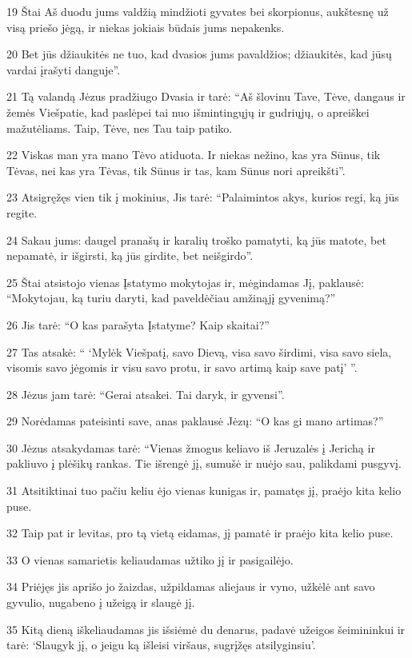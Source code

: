 \par 19 Štai Aš duodu jums valdžią mindžioti gyvates bei skorpionus, aukštesnę už visą priešo jėgą, ir niekas jokiais būdais jums nepakenks. 
\par 20 Bet jūs džiaukitės ne tuo, kad dvasios jums pavaldžios; džiaukitės, kad jūsų vardai įrašyti danguje”. 
\par 21 Tą valandą Jėzus pradžiugo Dvasia ir tarė: “Aš šlovinu Tave, Tėve, dangaus ir žemės Viešpatie, kad paslėpei tai nuo išmintingųjų ir gudriųjų, o apreiškei mažutėliams. Taip, Tėve, nes Tau taip patiko. 
\par 22 Viskas man yra mano Tėvo atiduota. Ir niekas nežino, kas yra Sūnus, tik Tėvas, nei kas yra Tėvas, tik Sūnus ir tas, kam Sūnus nori apreikšti”. 
\par 23 Atsigręžęs vien tik į mokinius, Jis tarė: “Palaimintos akys, kurios regi, ką jūs regite. 
\par 24 Sakau jums: daugel pranašų ir karalių troško pamatyti, ką jūs matote, bet nepamatė, ir išgirsti, ką jūs girdite, bet neišgirdo”. 
\par 25 Štai atsistojo vienas Įstatymo mokytojas ir, mėgindamas Jį, paklausė: “Mokytojau, ką turiu daryti, kad paveldėčiau amžinąjį gyvenimą?” 
\par 26 Jis tarė: “O kas parašyta Įstatyme? Kaip skaitai?” 
\par 27 Tas atsakė: “ ‘Mylėk Viešpatį, savo Dievą, visa savo širdimi, visa savo siela, visomis savo jėgomis ir visu savo protu, ir savo artimą kaip save patį’ ”. 
\par 28 Jėzus jam tarė: “Gerai atsakei. Tai daryk, ir gyvensi”. 
\par 29 Norėdamas pateisinti save, anas paklausė Jėzų: “O kas gi mano artimas?” 
\par 30 Jėzus atsakydamas tarė: “Vienas žmogus keliavo iš Jeruzalės į Jerichą ir pakliuvo į plėšikų rankas. Tie išrengė jį, sumušė ir nuėjo sau, palikdami pusgyvį. 
\par 31 Atsitiktinai tuo pačiu keliu ėjo vienas kunigas ir, pamatęs jį, praėjo kita kelio puse. 
\par 32 Taip pat ir levitas, pro tą vietą eidamas, jį pamatė ir praėjo kita kelio puse. 
\par 33 O vienas samarietis keliaudamas užtiko jį ir pasigailėjo. 
\par 34 Priėjęs jis aprišo jo žaizdas, užpildamas aliejaus ir vyno, užkėlė ant savo gyvulio, nugabeno į užeigą ir slaugė jį. 
\par 35 Kitą dieną iškeliaudamas jis išsiėmė du denarus, padavė užeigos šeimininkui ir tarė: ‘Slaugyk jį, o jeigu ką išleisi viršaus, sugrįžęs atsilyginsiu’. 
